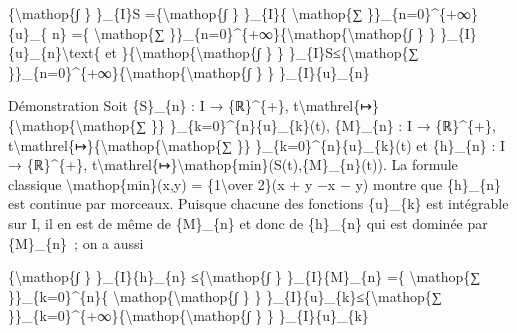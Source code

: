 \documentclass[]{article}
\begin{document}
\{\textbackslash{}mathop\{∫ \} \}\_\{I\}S =\{\textbackslash{}mathop\{∫
\} \}\_\{I\}\{ \textbackslash{}mathop\{∑
\}\}\_\{n=0\}\^{}\{+∞\}\{u\}\_\{ n\} =\{ \textbackslash{}mathop\{∑
\}\}\_\{n=0\}\^{}\{+∞\}\{\textbackslash{}mathop\{\textbackslash{}mathop\{∫
\} \} \}\_\{I\}\{u\}\_\{n\}\textbackslash{}text\{ et
\}\{\textbackslash{}mathop\{\textbackslash{}mathop\{∫ \} \}
\}\_\{I\}\textbar{}S\textbar{}≤\{\textbackslash{}mathop\{∑
\}\}\_\{n=0\}\^{}\{+∞\}\{\textbackslash{}mathop\{\textbackslash{}mathop\{∫
\} \} \}\_\{I\}\textbar{}\{u\}\_\{n\}\textbar{}

Démonstration Soit \{S\}\_\{n\} : I → \{ℝ\}\^{}\{+\},
t\textbackslash{}mathrel\{↦\}\{\textbackslash{}mathop\{\textbackslash{}mathop\{∑
\}\} \}\_\{k=0\}\^{}\{n\}\{u\}\_\{k\}(t), \{M\}\_\{n\} : I →
\{ℝ\}\^{}\{+\},
t\textbackslash{}mathrel\{↦\}\{\textbackslash{}mathop\{\textbackslash{}mathop\{∑
\}\} \}\_\{k=0\}\^{}\{n\}\textbar{}\{u\}\_\{k\}(t)\textbar{} et
\{h\}\_\{n\} : I → \{ℝ\}\^{}\{+\},
t\textbackslash{}mathrel\{↦\}\textbackslash{}mathop\{min\}(\textbar{}S(t)\textbar{},\{M\}\_\{n\}(t)).
La formule classique \textbackslash{}mathop\{min\}(x,y) =
\{1\textbackslash{}over 2\}(x + y −\textbar{}x − y\textbar{}) montre que
\{h\}\_\{n\} est continue par morceaux. Puisque chacune des fonctions
\textbar{}\{u\}\_\{k\}\textbar{} est intégrable sur I, il en est de même
de \{M\}\_\{n\} et donc de \{h\}\_\{n\} qui est dominée par
\{M\}\_\{n\}~; on a aussi

\{\textbackslash{}mathop\{∫ \} \}\_\{I\}\{h\}\_\{n\}
≤\{\textbackslash{}mathop\{∫ \} \}\_\{I\}\{M\}\_\{n\} =\{
\textbackslash{}mathop\{∑ \}\}\_\{k=0\}\^{}\{n\}\{
\textbackslash{}mathop\{\textbackslash{}mathop\{∫ \} \}
\}\_\{I\}\textbar{}\{u\}\_\{k\}\textbar{}≤\{\textbackslash{}mathop\{∑
\}\}\_\{k=0\}\^{}\{+∞\}\{\textbackslash{}mathop\{\textbackslash{}mathop\{∫
\} \} \}\_\{I\}\textbar{}\{u\}\_\{k\}\textbar{}
\end{document}
